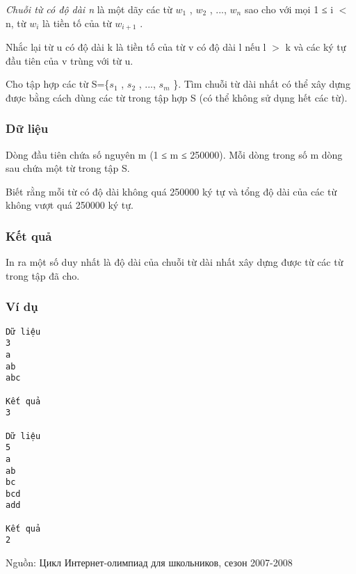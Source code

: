 



\textit{    Chuỗi từ có độ dài n   }   là một dãy các từ $w_{1}$   , $w_{2}$   , ..., $w_{n}$   sao cho với mọi 1 ≤ i $<$ n, từ $w_{i}$   là tiền tố của từ $w_{i+1}$   .  

   Nhắc lại từ u có độ dài k là tiền tố của từ v có độ dài l nếu l $>$ k và các ký tự đầu tiên của v trùng với từ u.  

   Cho tập hợp các từ S=\{$s_{1}$   , $s_{2}$   , ..., $s_{m}$   \}. Tìm chuỗi từ dài nhất có thể xây dựng  được bằng cách dùng các từ trong tập hợp S (có thể không sử dụng hết các từ).  

\subsubsection{   Dữ liệu  }

   Dòng đầu tiên chứa số nguyên m (1 ≤ m ≤ 250000). Mỗi dòng trong số m dòng sau chứa một từ trong tập S.  

   Biết rằng mỗi từ có độ dài không quá 250000 ký tự và tổng độ dài của các từ không vượt quá 250000 ký tự.  

\subsubsection{   Kết quả  }

   In ra một số duy nhất là độ dài của chuỗi từ dài nhất xây dựng được từ các từ trong tập đã cho.  

\subsubsection{   Ví dụ  }
\begin{verbatim}
Dữ liệu
3
a
ab
abc

Kết quả
3

Dữ liệu
5
a
ab
bc
bcd
add

Kết quả
2
\end{verbatim}

   Nguồn: Цикл Интернет-олимпиад для школьников, сезон 2007-2008  

